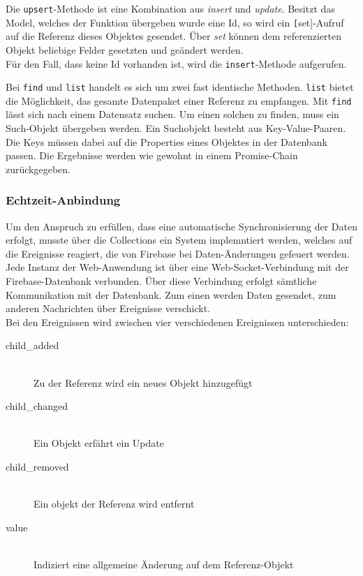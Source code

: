 Die \texttt{upsert}-Methode ist eine Kombination aus \textit{insert} und \textit{update}. Besitzt das Model, welches der Funktion übergeben wurde eine Id, so wird ein \texttt[set]-Aufruf auf die Referenz
dieses Objektes gesendet. Über \textit{set} können dem referenzierten Objekt beliebige Felder gesetzten und geändert werden.\\
Für den Fall, dass keine Id vorhanden ist, wird die \texttt{insert}-Methode aufgerufen.

Bei \texttt{find} und \texttt{list} handelt es sich um zwei fast identische Methoden. \texttt{list} bietet die Möglichkeit, das gesamte Datenpaket einer Referenz zu empfangen.
Mit \texttt{find} lässt sich nach einem Datensatz suchen. Um einen solchen zu finden, muss ein Such-Objekt übergeben werden.
Ein Suchobjekt besteht aus Key-Value-Paaren. Die Keys müssen dabei auf die Properties eines Objektes in der Datenbank passen.
Die Ergebnisse werden wie gewohnt in einem Promise-Chain zurückgegeben.

\subsubsection{Echtzeit-Anbindung}
Um den Anspruch zu erfüllen, dass eine automatische Synchronisierung der Daten erfolgt, musste über die Collections ein System implemntiert werden, welches
auf die Ereignisse reagiert, die von Firebase bei Daten-Änderungen gefeuert werden.\\
Jede Instanz der Web-Anwendung ist über eine Web-Socket-Verbindung mit der Firebase-Datenbank verbunden.
Über diese Verbindung erfolgt sämtliche Kommunikation mit der Datenbank. Zum einen werden Daten gesendet, zum anderen Nachrichten über Ereignisse verschickt.\\
Bei den Ereignissen wird zwischen vier verschiedenen Ereignissen unterschieden:
\begin{description}
\item[child_added]\hfill \\
Zu der Referenz wird ein neues Objekt hinzugefügt
\item[child_changed]\hfill \\
Ein Objekt erfährt ein Update
\item[child_removed]\hfill \\
Ein objekt der Referenz wird entfernt
\item[value]\hfill \\
Indiziert eine allgemeine Änderung auf dem Referenz-Objekt
\end{description}

